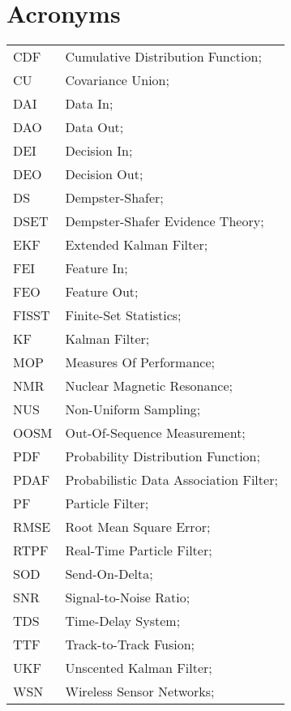 \section*{Acronyms}
\begin{longtable}{ll}
	CDF			& Cumulative Distribution Function; \\
	CU			& Covariance Union; \\
	DAI			& Data In; \\
	DAO			& Data Out; \\
	DEI			& Decision In; \\
	DEO 		& Decision Out; \\
	DS			& Dempster-Shafer; \\
	DSET 		& Dempster-Shafer Evidence Theory; \\		
	EKF			& Extended Kalman Filter; \\
	FEI			& Feature In; \\
	FEO			& Feature Out; \\
	FISST		& Finite-Set Statistics; \\
	KF 			& Kalman Filter; \\
	MOP 		& Measures Of Performance; \\
	NMR 		& Nuclear Magnetic Resonance; \\
	NUS 		& Non-Uniform Sampling; \\ 
	OOSM 		& Out-Of-Sequence Measurement; \\
	PDF         & Probability Distribution Function; \\
	PDAF		& Probabilistic Data Association Filter; \\
	PF 			& Particle Filter; \\
	RMSE		& Root Mean Square Error; \\
	RTPF		& Real-Time Particle Filter; \\
	SOD			& Send-On-Delta; \\
	SNR			& Signal-to-Noise Ratio; \\
	TDS			& Time-Delay System; \\
	TTF 		& Track-to-Track Fusion; \\
	UKF			& Unscented Kalman Filter; \\
	WSN			& Wireless Sensor Networks; \\
\end{longtable}

